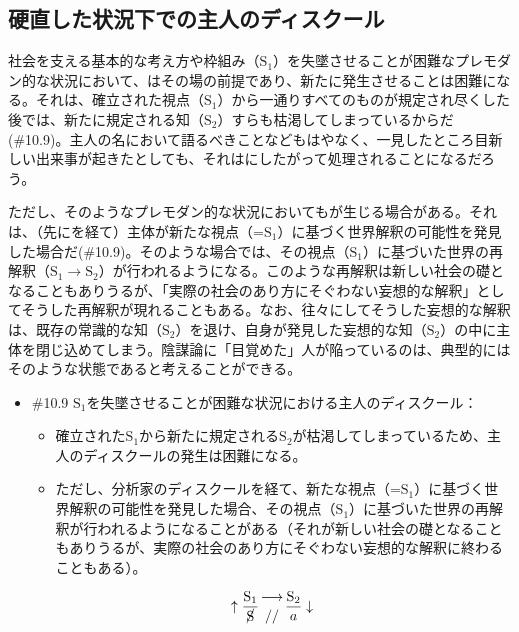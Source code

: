 \subsection{硬直した状況下での主人のディスクール}\label{ux786cux76f4ux3057ux305fux72b6ux6cc1ux4e0bux3067ux306eux4e3bux4ebaux306eux30c7ux30a3ux30b9ux30afux30fcux30eb}

社会を支える基本的な考え方や枠組み（\(\textrm{S}_1\)）を失墜させることが困難なプレモダン的な状況において、はその場の前提であり、新たに発生させることは困難になる。それは、確立された視点（\(\textrm{S}_1\)）から一通りすべてのものが規定され尽くした後では、新たに規定される知（\(\textrm{S}_2\)）すらも枯渇してしまっているからだ(\#10.9)。主人の名において語るべきことなどもはやなく、一見したところ目新しい出来事が起きたとしても、それはにしたがって処理されることになるだろう。

ただし、そのようなプレモダン的な状況においてもが生じる場合がある。それは、（先にを経て）主体が新たな視点（=\(\textrm{S}_1\)）に基づく世界解釈の可能性を発見した場合だ(\#10.9)。そのような場合では、その視点（\(\textrm{S}_1\)）に基づいた世界の再解釈（\(\textrm{S}_1\rightarrow\textrm{S}_2\)）が行われるようになる。このような再解釈は新しい社会の礎となることもありうるが、「実際の社会のあり方にそぐわない妄想的な解釈」としてそうした再解釈が現れることもある。なお、往々にしてそうした妄想的な解釈は、既存の常識的な知（\(\textrm{S}_2\)）を退け、自身が発見した妄想的な知（\(\textrm{S}_2\)）の中に主体を閉じ込めてしまう。陰謀論に「目覚めた」人が陥っているのは、典型的にはそのような状態であると考えることができる。

\begin{note}{}
  \begin{itemize}
    \tightlist
    \item{\#10.9} $\textrm{S}_1$を失墜させることが困難な状況における主人のディスクール：
      \begin{itemize}
        \tightlist
        \item 確立された$\textrm{S}_1$から新たに規定される$\textrm{S}_2$が枯渇してしまっているため、主人のディスクールの発生は困難になる。
        \item ただし、分析家のディスクールを経て、新たな視点（=$\textrm{S}_1$）に基づく世界解釈の可能性を発見した場合、その視点（$\textrm{S}_1$）に基づいた世界の再解釈が行われるようになることがある（それが新しい社会の礎となることもありうるが、実際の社会のあり方にそぐわない妄想的な解釈に終わることもある）。
      \end{itemize}

$$
\uparrow\frac{\mathrm{S_1}}{\cancel{\textrm{S}}}\genfrac{}{}{0pt}{}{\longrightarrow}{//}\frac{\mathrm{S_2}}{a}\downarrow
$$
  \end{itemize}
\end{note}

